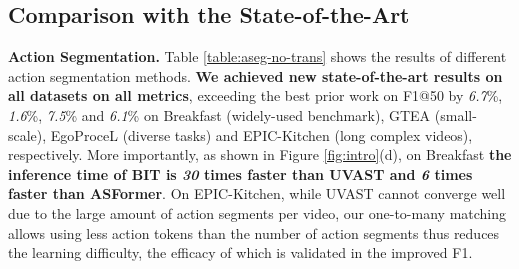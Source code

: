 \documentclass[10pt,twocolumn,letterpaper]{article}
\newcommand{\headline}[1]{\noindent \textbf{#1}}
\newcommand{\0}{\boldsymbol{0}}
\begin{document}
\subsection{Comparison with the State-of-the-Art}

\headline{Action Segmentation.}
Table \ref{table:aseg-no-trans} shows the results of different action segmentation methods. 
\textbf{We achieved new state-of-the-art results on all datasets on all metrics}, exceeding the best prior work on F1@50 by \textit{6.7}\%, \textit{1.6}\%, \textit{7.5}\% and \textit{6.1}\% on Breakfast (widely-used benchmark), GTEA (small-scale), EgoProceL (diverse tasks) and EPIC-Kitchen (long complex videos), respectively. 
More importantly, as shown in Figure \ref{fig:intro}(d), on Breakfast \textbf{the inference time of BIT is \textit{30} times faster than UVAST and \textit{6} times faster than ASFormer}.
On EPIC-Kitchen, while UVAST cannot converge well due to the large amount of action segments per video, our one-to-many matching allows using less action tokens than the number of action segments thus reduces the learning difficulty, the efficacy of which is validated in the improved F1.
\end{document}

